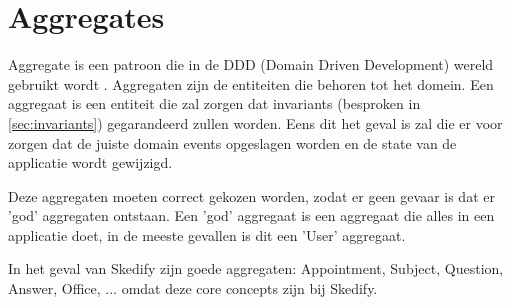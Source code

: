 
\section{Aggregates}
\label{sec:aggregates}

Aggregate is een patroon die in de DDD (Domain Driven Development) wereld gebruikt wordt \textcite{FowlerAggregate}. Aggregaten zijn de entiteiten die behoren tot het domein. Een aggregaat is een entiteit die zal zorgen dat invariants (besproken in \ref{sec:invariants}) gegarandeerd zullen worden. Eens dit het geval is zal die er voor zorgen dat de juiste domain events opgeslagen worden en de state van de applicatie wordt gewijzigd.

Deze aggregaten moeten correct gekozen worden, zodat er geen gevaar is dat er 'god' aggregaten ontstaan. Een 'god' aggregaat is een aggregaat die alles in een applicatie doet, in de meeste gevallen is dit een 'User' aggregaat.

In het geval van Skedify zijn goede aggregaten: Appointment, Subject, Question, Answer, Office, ... omdat deze core concepts zijn bij Skedify.